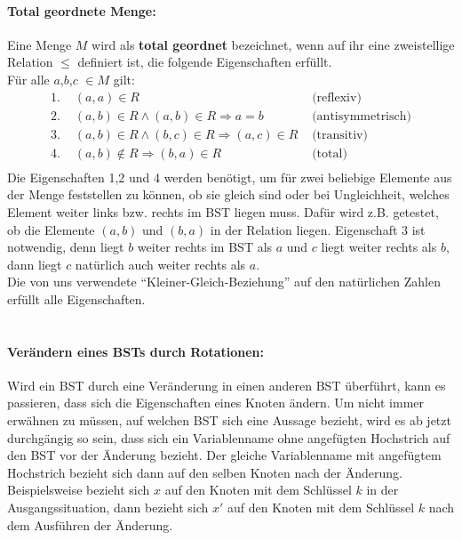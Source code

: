 \documentclass[a4paper,12pt]{article}
\begin{document}
\paragraph{Total geordnete Menge:} 
Eine Menge $M$ wird als \textbf{total geordnet} bezeichnet, wenn auf ihr eine zweistellige Relation $\leq$ definiert ist, die folgende Eigenschaften erfüllt.\\
Für alle $a$,$b$,$c$ $\in M$ gilt:
\begin{align*}
\text{1. } & (a,a) \in R  &\text{  (reflexiv)}\\
\text{2. } & (a,b) \in R  \land  (a,b) \in R \Rightarrow a = b  &\text{  (antisymmetrisch)}\\
\text{3. } & (a,b) \in R  \land  (b,c) \in R \Rightarrow  (a,c) \in R  &\text{  (transitiv)}\\
\text{4. } & (a,b) \notin R \Rightarrow  (b,a) \in R   &\text{  (total)}\\
\end{align*}
Die Eigenschaften 1,2 und 4 werden benötigt, um für zwei beliebige Elemente aus der Menge feststellen zu können, ob sie gleich sind oder bei Ungleichheit, welches Element weiter links bzw. rechts im BST liegen muss. Dafür wird z.B. getestet, ob die Elemente $(a,b)$ und $(b, a)$ in der Relation liegen. Eigenschaft 3 ist notwendig, denn liegt $b$ weiter rechts im BST als $a$ und $c$ liegt weiter rechts als $b$, dann liegt $c$ natürlich auch weiter rechts als $a$. \\
Die von uns verwendete \enquote{Kleiner-Gleich-Beziehung} auf den natürlichen Zahlen erfüllt alle Eigenschaften.
\\
\\




\paragraph{Verändern eines BSTs durch Rotationen:}
Wird ein BST durch eine Veränderung in einen anderen BST überführt, kann es passieren, dass sich die Eigenschaften eines Knoten ändern. Um nicht immer erwähnen zu müssen, auf welchen BST sich eine Aussage bezieht, wird es ab jetzt durchgängig so sein, dass sich ein Variablenname ohne angefügten Hochstrich auf den BST vor der Änderung bezieht. Der gleiche Variablenname mit angefügtem Hochstrich bezieht sich dann auf den selben Knoten nach der Änderung. Beispielsweise bezieht sich $x$ auf den Knoten mit dem Schlüssel $k$ in der Ausgangssituation, dann bezieht sich $x'$ auf den Knoten mit dem Schlüssel $k$ nach dem Ausführen der Änderung. \\
\end{document}

